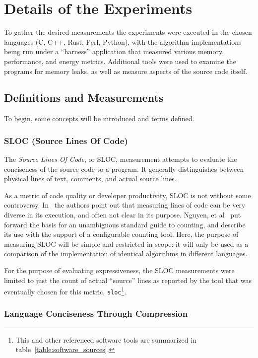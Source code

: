 \section{Details of the Experiments}
\label{sec:experiments}

To gather the desired measurements the experiments were executed in the chosen languages (C, C++, Rust, Perl, Python), with the algorithm implementations being run under a ``harness'' application that measured various memory, performance, and energy metrics. Additional tools were used to examine the programs for memory leaks, as well as measure aspects of the source code itself.

\subsection{Definitions and Measurements}

To begin, some concepts will be introduced and terms defined.

\subsubsection{SLOC (Source Lines Of Code)}

The \textit{Source Lines Of Code}, or SLOC, measurement attempts to evaluate the conciseness of the source code to a program. It generally distinguishes between physical lines of text, comments, and actual source lines.

As a metric of code quality or developer productivity, SLOC is not without some controversy. In~\cite{alpernas} the authors point out that measuring lines of code can be very diverse in its execution, and often not clear in its purpose. Nguyen, et al~\cite{nguyen} put forward the basis for an unambiguous standard guide to counting, and describe its use with the support of a configurable counting tool. Here, the purpose of measuring SLOC will be simple and restricted in scope: it will only be used as a comparison of the implementation of identical algorithms in different languages.

For the purpose of evaluating expressiveness, the SLOC measurements were limited to just the count of actual ``source'' lines as reported by the tool that was eventually chosen for this metric, \texttt{sloc}\footnote{This and other referenced software tools are summarized in table~\ref{table:software_sources}.}.

\subsubsection{Language Conciseness Through Compression}

